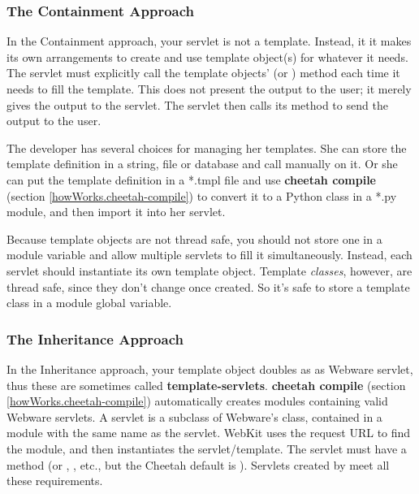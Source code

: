\subsubsection{The Containment Approach}
\label{webware.containment}

In the Containment approach, your servlet is not a template.  Instead, it 
it makes its own arrangements to create and use template object(s) for whatever
it needs.  The servlet must explicitly call the template objects'
 (or ) method each time it needs to fill
the template.  This does not present the output to the user; it merely gives
the output to the servlet.  The servlet then calls its
 method to send the output to the user.

The developer has several choices for managing her templates.  She can store the
template definition in a string, file or database and call
 manually on it.  Or she can put the
template definition in a *.tmpl file and use {\bf cheetah compile} (section
\ref{howWorks.cheetah-compile}) to convert it to a Python class in a *.py
module, and then import it into her servlet.

Because template objects are not thread safe, you should not store one
in a module variable and allow multiple servlets to fill it simultaneously.
Instead, each servlet should instantiate its own template object.  Template
{\em classes}, however, are thread safe, since they don't change once created.
So it's safe to store a template class in a module global variable.



\subsubsection{The Inheritance Approach}
\label{webware.inheritance}

In the Inheritance approach, your template object doubles as as Webware 
servlet, thus these are sometimes called {\bf template-servlets}.  {\bf cheetah
compile} (section \ref{howWorks.cheetah-compile}) automatically creates modules
containing valid Webware servlets.  A servlet is a subclass of Webware's
 class, contained in a module with the same name as
the servlet.  WebKit uses the request URL to find the module, and then
instantiates the servlet/template.  The servlet must have a 
method (or , , etc., but the
Cheetah default is ).  Servlets created by  meet all these requirements.

